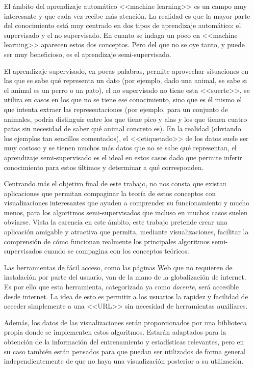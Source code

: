 
El ámbito del aprendizaje automático <<machine learning>> es un campo muy
interesante y que cada vez recibe más atención. La realidad es que la mayor
parte del conocimiento está muy centrado en dos tipos de aprendizaje automático:
el supervisado y el no supervisado. En cuanto se indaga un poco en <<machine
learning>> aparecen estos dos conceptos. Pero del que no se oye tanto, y puede
ser muy beneficioso, es el aprendizaje semi-supervisado. 

El aprendizaje supervisado, en pocas palabras, permite aprovechar situaciones en
las que se sabe qué representa un dato (por ejemplo, dado una animal, se sabe si
el animal es un perro o un pato), el no supervisado no tiene esta <<suerte>>, se
utiliza en casos en los que no se tiene ese conocimiento, sino que es él mismo
el que intenta extraer las representaciones (por ejemplo, para un conjunto de
animales, podría distinguir entre los que tiene pico y alas y los que tienen
cuatro patas sin necesidad de saber qué animal concreto es). En la realidad
(obviando los ejemplos tan sencillos comentados), el <<etiquetado>> de los datos
suele ser muy costoso y se tienen muchos más datos que no se sabe qué
representan, el aprendizaje semi-supervisado es el ideal en estos casos dado que
permite inferir conocimiento para estos últimos y determinar a qué corresponden.

Centrando más el objetivo final de este trabajo, no nos consta que existan
aplicaciones que permitan compaginar la teoría de estos conceptos con
visualizaciones interesantes que ayuden a comprender su funcionamiento y mucho
menos, para los algoritmos semi-supervisados que incluso en muchos casos suelen
obviarse. Vista la carencia en este ámbito, este trabajo pretende crear una
aplicación amigable y atractiva que permita, mediante visualizaciones, facilitar
la comprensión de cómo funcionan realmente los principales algoritmos
semi-supervisados cuando se compagina con los conceptos teóricos.

Las herramientas de fácil acceso, como las páginas Web que no requieren de
instalación por parte del usuario, van de la mano de la globalización de
internet. Es por ello que esta herramienta, categorizada ya como
\textit{docente}, será accesible desde internet. La idea de esto es permitir a
los usuarios la rapidez y facilidad de acceder simplemente a una <<URL>> sin
necesidad de herramientas auxiliares.

Además, los datos de las visualizaciones serán proporcionados por una biblioteca
propia donde se implementen estos algoritmos. Estarán adaptados para la
obtención de la información del entrenamiento y estadísticas relevantes, pero en
su caso también están pensados para que puedan ser utilizados de forma general
independientemente de que no haya una visualización posterior a su utilización.


